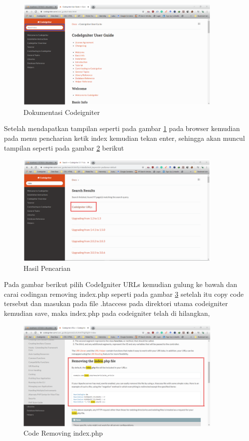 \begin{figure}[!htbp]
	\centerline{\includegraphics[width=0.90\textwidth]{figures/crs/2.png}}
	\caption{Dokumentasi Codeigniter}
	\label{crs2}
\end{figure}


Setelah mendapatkan tampilan seperti pada gambar \ref{crs2} pada browser kemudian pada menu pencharian ketik index kemudian tekan enter, sehingga akan muncul tampilan seperti pada gambar \ref{crs3} berikut \par

\begin{figure}[!htbp]
	\centerline{\includegraphics[width=0.90\textwidth]{figures/crs/3.png}}
	\caption{Hasil Pencarian}
	\label{crs3}
\end{figure}
\pagebreak
Pada gambar berikut pilih CodeIgniter URLs kemudian gulung ke bawah dan carai codingan removing index.php seperti pada gambar \ref{crs4} setelah itu copy code tersebut dan masukan pada file .htaccess pada direktori utama codeigniter kemudian save, maka index.php pada codeigniter telah di hilangkan,

\begin{figure}[!htbp]
	\centerline{\includegraphics[width=0.90\textwidth]{figures/crs/4.png}}
	\caption{Code Removing index.php}
	\label{crs4}
\end{figure}

